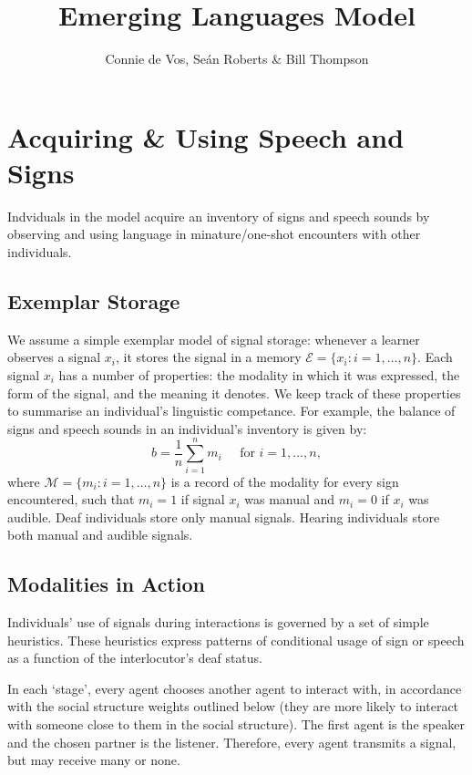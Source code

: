\documentclass[11pt, oneside]{article}
\title{Emerging Languages Model}
\author{Connie de Vos, Se\'{a}n Roberts \& Bill Thompson}
\begin{document}
\maketitle

\section{Acquiring \& Using Speech and Signs} %
\label{sec:Acq}
Indviduals in the model acquire an inventory of signs and speech sounds by observing and using language in minature/one-shot encounters with other individuals.

\subsection{Exemplar Storage} %
\label{sub:exemplar_storage}
We assume a simple exemplar model of signal storage: whenever a learner observes a signal $x_i$, it stores the signal in a memory $\mathcal{E} = \{x_i\colon i = 1,\ldots,n\}$. Each signal $x_i$ has a number of properties: the modality in which it was expressed, the form of the signal, and the meaning it denotes. We keep track of these properties to summarise an individual's linguistic competance. For example, the balance of signs and speech sounds in an individual's inventory is given by:
\begin{equation}
	b = \frac{1}{n}\sum_{i=1}^n m_i \;\;\;\;\; \mbox{for } i= 1,\ldots,n,
\end{equation}
where $\mathcal{M} = \{m_i\colon i =1,\ldots,n\}$ is a record of the modality for every sign encountered, such that $m_i = 1$ if signal $x_i$ was manual and $m_i = 0$ if $x_i$ was audible. Deaf individuals store only manual signals. Hearing individuals store both manual and audible signals.

\subsection{Modalities in Action} %
\label{sub:modalities_in_action}
Individuals' use of signals during interactions is governed by a set of simple heuristics. These heuristics express patterns of conditional usage of sign or speech as a function of the interlocutor's deaf status. 

In each `stage', every agent chooses another agent to interact with, in accordance with the social structure weights outlined below (they are more likely to interact with someone close to them in the social structure). The first agent is the speaker and the chosen partner is the listener.  Therefore, every agent transmits a signal, but may receive many or none.
\end{document}
